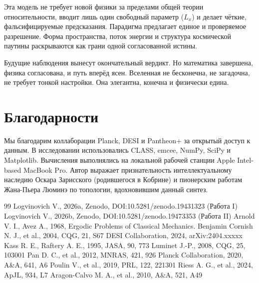 \documentclass[12pt,a4paper]{article}
\begin{document}
Эта модель не требует новой физики за пределами общей теории относительности, вводит лишь один свободный параметр ($L_x$) и делает чёткие, фальсифицируемые предсказания. Парадигма предлагает единое и проверяемое разрешение. Форма пространства, поток энергии и структура космической паутины раскрываются как грани одной согласованной истины.

Будущие наблюдения вынесут окончательный вердикт. Но математика завершена, физика согласована, и путь вперёд ясен. Вселенная не бесконечна, не загадочна, не требует тонкой настройки. Она элегантна, конечна и физически едина.

\section*{Благодарности}
Мы благодарим коллаборации Planck, DESI и Pantheon+ за открытый доступ к данным. В исследовании использовались CLASS, emcee, NumPy, SciPy и Matplotlib. Вычисления выполнялись на локальной рабочей станции Apple Intel-based MacBook Pro. Автор выражает признательность интеллектуальному наследию Оскара Зарисского (родившегося в Кобрине) и пионерским работам Жана-Пьера Люминэ по топологии, вдохновившим данный синтез.

\begin{thebibliography}{99}
 Logvinovich V., 2026a, Zenodo, DOI:10.5281/zenodo.19431323 (Работа I)
 Logvinovich V., 2026b, Zenodo, DOI:10.5281/zenodo.19473353 (Работа II)
 Arnold V. I., Avez A., 1968, Ergodic Problems of Classical Mechanics. Benjamin
 Cornish N. J., et al., 2004, CQG, 21, S67
 DESI Collaboration, 2024, arXiv:2404.xxxxx
 Kass R. E., Raftery A. E., 1995, JASA, 90, 773
 Luminet J.-P., 2008, CQG, 25, 103001
 Pan D. C., et al., 2012, MNRAS, 421, 926
 Planck Collaboration, 2020, A\&A, 641, A6
 Poulin V., et al., 2019, PRL, 122, 221301
 Riess A. G., et al., 2024, ApJL, 934, L7
 Aragon-Calvo M. A., et al., 2010, A\&A, 521, A49
\end{thebibliography}
\end{document}

